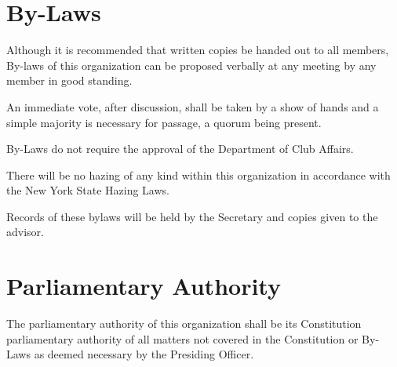 \section{By-Laws}
\begin{subroutines}
\item Although it is recommended that written copies be handed out to all members, By-laws of this organization can be proposed verbally at any meeting by any member in good standing.
\item An immediate vote, after discussion, shall be taken by a show of hands and a simple majority is necessary for passage, a quorum being present.
\item By-Laws do not require the approval of the Department of Club Affairs.
\item There will be no hazing of any kind within this organization in accordance with the New York State Hazing Laws.
\item Records of these bylaws will be held by the Secretary and copies given to the advisor.
\end{subroutines}

\section{Parliamentary Authority}
\begin{subroutines}
\item The parliamentary authority of this organization shall be its Constitution parliamentary authority of all matters not covered in the Constitution or By-Laws as deemed necessary by the Presiding Officer.
\end{subroutines}


